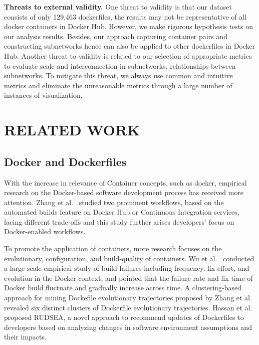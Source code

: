 \documentclass[sigconf]{acmart}
\begin{document}
\smallskip
\noindent\textbf{Threats to external validity. } One threat to validity is that our dataset consists of only 129,463 dockerfiles, the results may not be representative of all docker containers in Docker Hub. However, we make rigorous hypothesis tests on our analysis results. Besides, our approach capturing container pairs and constructing subnetworks hence can also be applied to other dockerfiles in Docker Hub.  
Another threat to validity is related to our selection of appropriate metrics to evaluate scale and interconnection in subnetworks, relationships between subnetworks. To mitigate this threat, we always use common and intuitive metrics and eliminate the unreasonable metrics through a large number of instances of visualization.   
  





\section{RELATED WORK}
\label{sec:rw}
\subsection{Docker and Dockerfiles}

With the increase in relevance of Container concepts, such as docker, 
empirical research on the Docker-based software development process has received more attention. Zhang et al.~\cite{zhang2018one} 
studied two prominent workflows, based on the automated builds feature on Docker Hub or Continuous Integration services, 
facing different trade-offs and this study further arises developers' focus on Docker-enabled workflows. 

To promote the application of containers, more research focuses on the evolutionary, 
configuration, and build-quality of containers. Wu et al.~\cite{wuempirical} conducted a large-scale 
empirical study of build failures including frequency, fix effort, and evolution in the Docker context, 
and pointed that the failure rate and fix time of Docker build fluctuate and gradually increase across time.
 A clustering-based approach for mining Dockefile evolutionary trajectories proposed by Zhang et al.~\cite{zhang2019clustering} 
 revealed six distinct clusters of Dockerfile evolutionary trajectories. Hassan et al.~\cite{hassan2018rudsea} proposed RUDSEA, 
 a novel approach to recommend updates of Dockerfiles to developers based on analyzing changes in software
  environment assumptions and their impacts.  %
\end{document}
